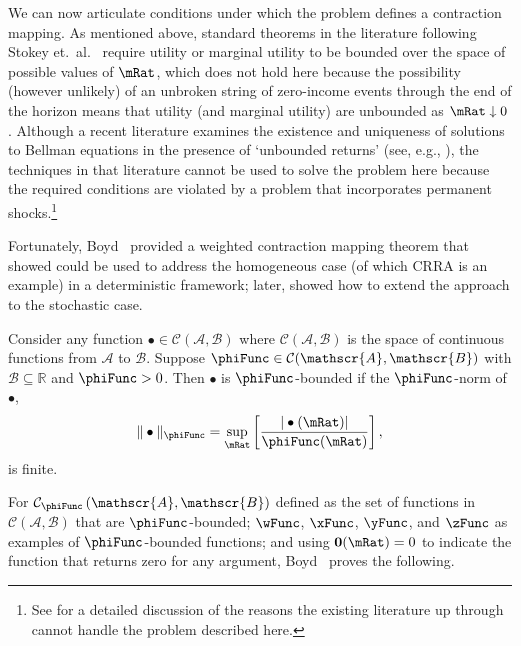 \documentclass[BufferStockTheory]{subfiles}
\begin{document}
\label{subsec:contraction}

We can now articulate conditions under which the problem defines a contraction mapping.
As mentioned above, standard theorems in the literature following Stokey et.\ al.~\citeyearpar{slpMethods} require utility or marginal utility to be bounded over the space of possible values of $\mRat$, which does not hold here because the possibility (however unlikely) of an unbroken string of zero-income events through the end of the horizon means that utility (and marginal utility) are unbounded as $\mRat \downarrow 0$.  Although a recent literature examines the existence and uniqueness of solutions to Bellman equations in the presence of `unbounded returns' (see, e.g., \cite{mnUnique}), the techniques in that literature cannot be used to solve the problem here because the required conditions are violated by a problem that incorporates permanent shocks.\footnote{See \cite{yaoNote} for a detailed discussion of the reasons the existing literature up through \cite{mnUnique} cannot handle the problem described here.}

Fortunately, Boyd~\citeyearpar{jboydWeighted} provided a weighted contraction mapping theorem that \cite{asHomogeneous} showed could be used to address the homogeneous case (of which CRRA is an example) in a deterministic framework; later, \cite{duranDiscounting} showed how to extend the \cite{jboydWeighted} approach to the stochastic case.
\begin{defn}
  Consider any function $\bullet\in \mathcal{C}(\mathscr{A},\mathscr{B})$ where $\mathcal{C}(\mathscr{A},\mathscr{B})$ is the space of continuous functions from $\mathscr{A}$ to $%
  \mathscr{B}$. Suppose $\phiFunc \in \mathcal{C}(\mathscr{A},\mathscr{B})$ with $%
  \mathscr{B}\subseteq\mathbb{R}$ and $\phiFunc >0$. Then $\bullet$ is $\phiFunc$-bounded if the $\phiFunc$-norm of $\bullet$,
  \begin{equation}
    \Vert \bullet\Vert _{\phiFunc }=\sup_{\mRat}\left[ \frac{|\bullet(\mRat)|}{\phiFunc (\mRat)}\right] ,
    \label{eq:phinorm}
  \end{equation}%
  is finite.
\end{defn}

For $\mathcal{C}_{\phiFunc }\left( \mathscr{A},\mathscr{B}\right) $
defined as the set of functions in
$\mathcal{C}(\mathscr{A},\mathscr{B})$ that are $\phiFunc$-bounded;
$\wFunc$, $\xFunc$, $\yFunc$, and $\zFunc$ as examples of
$\phiFunc$-bounded functions; and using {$\mathbf{0}(\mRat)=0$} to
indicate the function that returns zero for any argument,
Boyd~\citeyearpar{jboydWeighted} proves the following.
\end{document}
